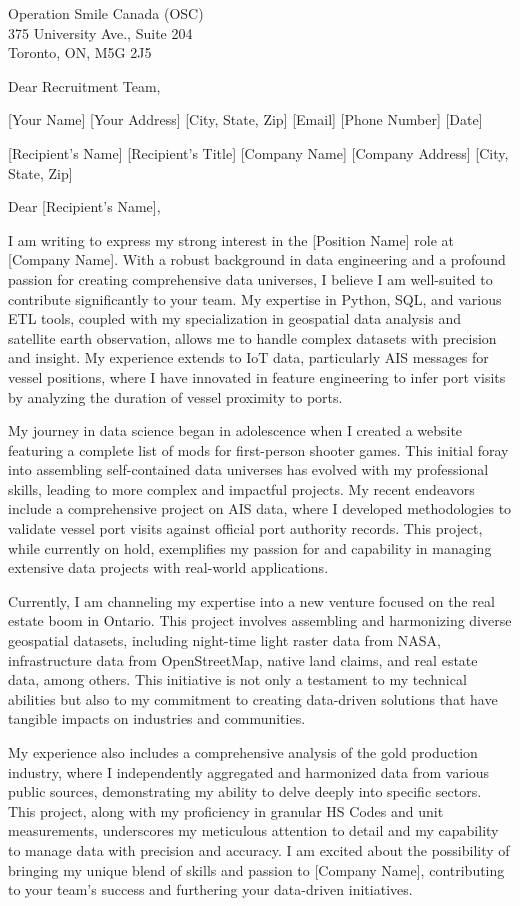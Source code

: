 \documentclass{letter}
\begin{document}
\begin{letter}{Operation Smile Canada (OSC) \\ 375 University Ave., Suite 204 \\ Toronto, ON, M5G 2J5}
\opening{Dear Recruitment Team,}


[Your Name]
[Your Address]
[City, State, Zip]
[Email]
[Phone Number]
[Date]

[Recipient's Name]
[Recipient's Title]
[Company Name]
[Company Address]
[City, State, Zip]

Dear [Recipient's Name],

I am writing to express my strong interest in the [Position Name] role at [Company Name]. With a robust background in data engineering and a profound passion for creating comprehensive data universes, I believe I am well-suited to contribute significantly to your team. My expertise in Python, SQL, and various ETL tools, coupled with my specialization in geospatial data analysis and satellite earth observation, allows me to handle complex datasets with precision and insight. My experience extends to IoT data, particularly AIS messages for vessel positions, where I have innovated in feature engineering to infer port visits by analyzing the duration of vessel proximity to ports.

My journey in data science began in adolescence when I created a website featuring a complete list of mods for first-person shooter games. This initial foray into assembling self-contained data universes has evolved with my professional skills, leading to more complex and impactful projects. My recent endeavors include a comprehensive project on AIS data, where I developed methodologies to validate vessel port visits against official port authority records. This project, while currently on hold, exemplifies my passion for and capability in managing extensive data projects with real-world applications.

Currently, I am channeling my expertise into a new venture focused on the real estate boom in Ontario. This project involves assembling and harmonizing diverse geospatial datasets, including night-time light raster data from NASA, infrastructure data from OpenStreetMap, native land claims, and real estate data, among others. This initiative is not only a testament to my technical abilities but also to my commitment to creating data-driven solutions that have tangible impacts on industries and communities.

My experience also includes a comprehensive analysis of the gold production industry, where I independently aggregated and harmonized data from various public sources, demonstrating my ability to delve deeply into specific sectors. This project, along with my proficiency in granular HS Codes and unit measurements, underscores my meticulous attention to detail and my capability to manage data with precision and accuracy. I am excited about the possibility of bringing my unique blend of skills and passion to [Company Name], contributing to your team's success and furthering your data-driven initiatives.


\end{letter}
\end{document}
